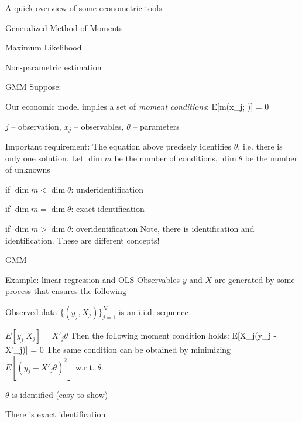 \begin{frame}{A quick overview of some econometric tools}
	\bi
		\item{Generalized Method of Moments}
		\item{Maximum Likelihood}
		\item{Non-parametric estimation}
	\ei
\end{frame}

\begin{frame}{GMM}
	Suppose:
	\bi
		\item{Our economic model implies a set of \emph{moment conditions}:
		\be
			E[m(x_j; \theta)] = 0
		\ee}
		\item{$j$ -- observation, $x_j$ -- observables, $\theta$ -- parameters}
		\item{Important requirement: The equation above precisely {\color{blue}identifies} $\theta$, i.e. there is only one solution.}
	\ei
	Let $\dim m$ be the number of conditions, $\dim\theta$ be the number of unknowns
	\bi
		\item{if $\dim m < \dim\theta$: \color{red}underidentification}
		\item{if $\dim m = \dim\theta$: \color{red}exact identification}
		\item{if $\dim m > \dim\theta$: \color{red}overidentification}
	\ei
	Note, there is {\color{blue}identification} and {\color{red}identification}. These are different concepts!
\end{frame}

\begin{frame}{GMM}
		\begin{block}{Example: linear regression and OLS}
		Observables $y$ and $X$ are generated by some process that ensures the following
		\bi
			\item{Observed data $\{(y_j, X_j)\}_{j=1}^N$ is an i.i.d. sequence}
			\item{$E[y_j|X_j] = X'_j\theta$}
		\ei
		Then the following moment condition holds:
		\be
			E[X_j(y_j - X'_j\theta)] = 0
		\ee
		The same condition can be obtained by minimizing $E[(y_j - X'_j\theta)^2]$ w.r.t. $\theta$.
		\bi
			\item{$\theta$ is identified (easy to show)}
			\item{There is exact identification}
		\ei
	\end{block}
\end{frame}

